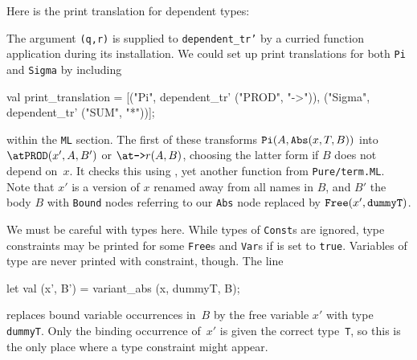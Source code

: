 Here is the print translation for dependent types:
The argument {\tt (q,r)} is supplied to {\tt dependent_tr'} by a curried
function application during its installation.  We could set up print
translations for both {\tt Pi} and {\tt Sigma} by including
\begin{ttbox}
val print_translation =
  [("Pi",    dependent_tr' ("{\at}PROD", "{\at}->")),
   ("Sigma", dependent_tr' ("{\at}SUM", "{\at}*"))];
\end{ttbox}
within the {\tt ML} section.  The first of these transforms ${\tt Pi}(A,
(x, T, B))$ into $\hbox{\tt{\at}PROD}(x', A, B')$ or
$\hbox{\tt{\at}->}r(A, B)$, choosing the latter form if $B$ does not depend
on~$x$.  It checks this using , yet another function
from {\tt Pure/term.ML}.  Note that $x'$ is a version of $x$ renamed away
from all names in $B$, and $B'$ the body $B$ with {\tt Bound} nodes
referring to our {\tt Abs} node replaced by $ (x',
)$.

We must be careful with types here.  While types of {\tt Const}s are
ignored, type constraints may be printed for some {\tt Free}s and
{\tt Var}s if  is set to {\tt true}.  Variables of type
 are never printed with constraint, though.  The line
\begin{ttbox}
        let val (x', B') = variant_abs (x, dummyT, B);
\end{ttbox}
replaces bound variable occurrences in~$B$ by the free variable $x'$ with
type {\tt dummyT}.  Only the binding occurrence of~$x'$ is given the
correct type~{\tt T}, so this is the only place where a type
constraint might appear. 
